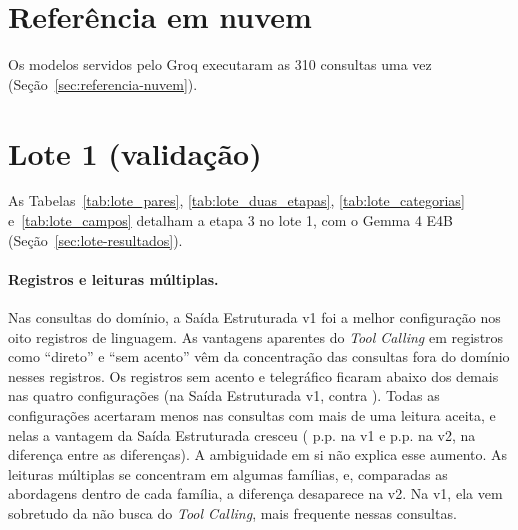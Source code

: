 

\section{Referência em nuvem}
\label{apx:res-nuvem}

Os  modelos servidos pelo Groq executaram as 310 consultas uma vez (Seção~\ref{sec:referencia-nuvem}).



\section{Lote 1 (validação)}
\label{apx:lote}

As Tabelas~\ref{tab:lote_pares}, \ref{tab:lote_duas_etapas}, \ref{tab:lote_categorias} e~\ref{tab:lote_campos} detalham a etapa 3 no lote 1, com o Gemma 4 E4B (Seção~\ref{sec:lote-resultados}).


\begin{landscape}
\end{landscape}



\paragraph{Registros e leituras múltiplas.} Nas consultas do domínio, a Saída Estruturada v1 foi a melhor configuração nos oito registros de linguagem. As vantagens aparentes do \textit{Tool Calling} em registros como ``direto'' e ``sem acento'' vêm da concentração das consultas fora do domínio nesses registros. Os registros sem acento e telegráfico ficaram abaixo dos demais nas quatro configurações (na Saída Estruturada v1,  contra ). Todas as configurações acertaram menos nas consultas com mais de uma leitura aceita, e nelas a vantagem da Saída Estruturada cresceu ( p.p. na v1 e  p.p. na v2, na diferença entre as diferenças). A ambiguidade em si não explica esse aumento. As leituras múltiplas se concentram em algumas famílias, e, comparadas as abordagens dentro de cada família, a diferença desaparece na v2. Na v1, ela vem sobretudo da não busca do \textit{Tool Calling}, mais frequente nessas consultas.
